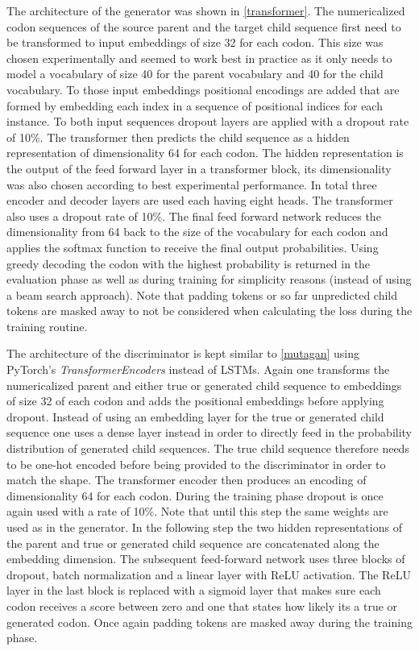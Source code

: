 The architecture of the generator was shown in \autoref{transformer}. The numericalized codon sequences of the source parent and the target child sequence first need to be transformed to input embeddings of size 32 for each codon. This size was chosen experimentally and seemed to work best in practice as it only needs to model a vocabulary of size 40 for the parent vocabulary and 40 for the child vocabulary. To those input embeddings positional encodings are added that are formed by embedding each index in a sequence of positional indices for each instance. To both input sequences dropout layers are applied with a dropout rate of 10\%. The transformer then predicts the child sequence as a hidden representation of dimensionality 64 for each codon. The hidden representation is the output of the feed forward layer in a transformer block, its dimensionality was also chosen according to best experimental performance. In total three encoder and decoder layers are used each having eight heads. The transformer also uses a dropout rate of 10\%. The final feed forward network reduces the dimensionality from 64 back to the size of the vocabulary for each codon and applies the softmax function to receive the final output probabilities. Using greedy decoding the codon with the highest probability is returned in the evaluation phase as well as during training for simplicity reasons (instead of using a beam search approach). Note that padding tokens or so far unpredicted child tokens are masked away to not be considered when calculating the loss during the training routine.

The architecture of the discriminator is kept similar to \autoref{mutagan} using PyTorch's \textit{TransformerEncoders} instead of \acp{LSTM}. Again one transforms the numericalized parent and either true or generated child sequence to embeddings of size 32 of each codon and adds the positional embeddings before applying dropout. Instead of using an embedding layer for the true or generated child sequence one uses a dense layer instead in order to directly feed in the probability distribution of generated child sequences. The true child sequence therefore needs to be one-hot encoded before being provided to the discriminator in order to match the shape. The transformer encoder then produces an encoding of dimensionality 64 for each codon. During the training phase dropout is once again used with a rate of 10\%. Note that until this step the same weights are used as in the generator. In the following step the two hidden representations of the parent and true or generated child sequence are concatenated along the embedding dimension. The subsequent feed-forward network uses three blocks of dropout, batch normalization and a linear layer with \ac{ReLU} activation. The \ac{ReLU} layer in the last block is replaced with a sigmoid layer that makes sure each codon receives a score between zero and one that states how likely its a true or generated codon. Once again padding tokens are masked away during the training phase.

